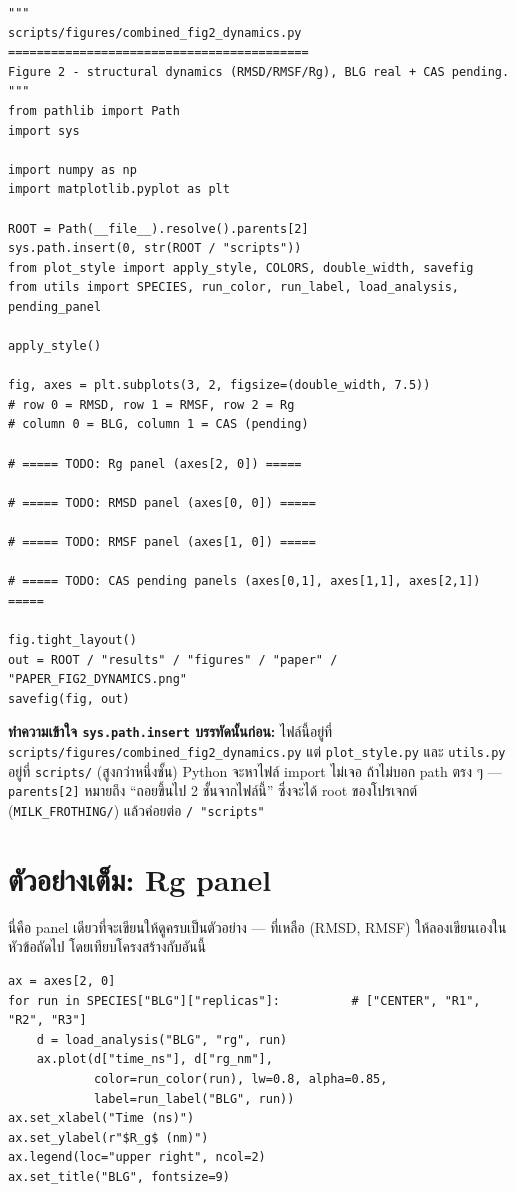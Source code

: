 \documentclass[11pt,a4paper]{article}
\begin{document}
\begin{lstlisting}
"""
scripts/figures/combined_fig2_dynamics.py
==========================================
Figure 2 - structural dynamics (RMSD/RMSF/Rg), BLG real + CAS pending.
"""
from pathlib import Path
import sys

import numpy as np
import matplotlib.pyplot as plt

ROOT = Path(__file__).resolve().parents[2]
sys.path.insert(0, str(ROOT / "scripts"))
from plot_style import apply_style, COLORS, double_width, savefig
from utils import SPECIES, run_color, run_label, load_analysis, pending_panel

apply_style()

fig, axes = plt.subplots(3, 2, figsize=(double_width, 7.5))
# row 0 = RMSD, row 1 = RMSF, row 2 = Rg
# column 0 = BLG, column 1 = CAS (pending)

# ===== TODO: Rg panel (axes[2, 0]) =====

# ===== TODO: RMSD panel (axes[0, 0]) =====

# ===== TODO: RMSF panel (axes[1, 0]) =====

# ===== TODO: CAS pending panels (axes[0,1], axes[1,1], axes[2,1]) =====

fig.tight_layout()
out = ROOT / "results" / "figures" / "paper" / "PAPER_FIG2_DYNAMICS.png"
savefig(fig, out)
\end{lstlisting}

\textbf{ทำความเข้าใจ \texttt{sys.path.insert} บรรทัดนั้นก่อน:} ไฟล์นี้อยู่ที่
\texttt{scripts/figures/combined\_fig2\_dynamics.py} แต่ \texttt{plot\_style.py} และ
\texttt{utils.py} อยู่ที่ \texttt{scripts/} (สูงกว่าหนึ่งชั้น) Python จะหาไฟล์ import ไม่เจอ
ถ้าไม่บอก path ตรง ๆ — \texttt{parents[2]} หมายถึง ``ถอยขึ้นไป 2 ชั้นจากไฟล์นี้'' ซึ่งจะได้
root ของโปรเจกต์ (\texttt{MILK\_FROTHING/}) แล้วค่อยต่อ \texttt{/ "scripts"}

\section{ตัวอย่างเต็ม: Rg panel}
นี่คือ panel เดียวที่จะเขียนให้ดูครบเป็นตัวอย่าง — ที่เหลือ (RMSD, RMSF) ให้ลองเขียนเองในหัวข้อถัดไป
โดยเทียบโครงสร้างกับอันนี้

\begin{lstlisting}
ax = axes[2, 0]
for run in SPECIES["BLG"]["replicas"]:          # ["CENTER", "R1", "R2", "R3"]
    d = load_analysis("BLG", "rg", run)
    ax.plot(d["time_ns"], d["rg_nm"],
            color=run_color(run), lw=0.8, alpha=0.85,
            label=run_label("BLG", run))
ax.set_xlabel("Time (ns)")
ax.set_ylabel(r"$R_g$ (nm)")
ax.legend(loc="upper right", ncol=2)
ax.set_title("BLG", fontsize=9)
\end{lstlisting}
\end{document}

